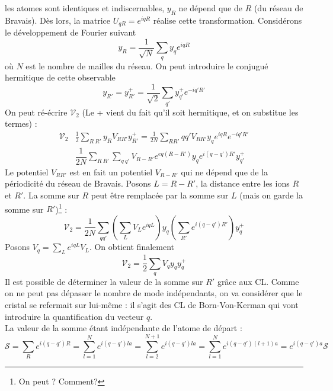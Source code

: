 les atomes sont identiques et indiscernables, $y_R$ ne dépend que de $R$ (du 
réseau de Bravais). Dès lors, la matrice $U_{qR} = e^{iqR}$ réalise cette 
transformation. Considérons le développement de Fourier suivant
\begin{equation}
y_R = \dfrac{1}{\sqrt{N}}\sum_q y_qe^{iqR}
\label{eq:DevFourier}
\end{equation}
où $N$ est le nombre de mailles du réseau. On peut introduire le conjugué hermitique 
de cette observable
\begin{equation}
y_{R'} = y_{R'}^+ = \dfrac{1}{\sqrt{2}}\sum_{q'} y_{q'}^+ e^{-iq'R'}
\end{equation}
On peut ré-écrire $\mathcal{V}_2$ (Le + vient du fait qu'il soit hermitique, et 
on substitue les termes) : 
\begin{equation}
\begin{array}{ll}
\mathcal{V}_2 & \displaystyle \frac{1}{2}\sum_{R\ R'} y_R V_{RR'}y_{R'}^+ = 
\frac{1}{2N}\sum_{RR'}{qq'} V_{RR'} y_qe^{iqR}e^{-iq'R'}\\
 & \displaystyle \dfrac{1}{2N}\sum_{R\ R'}\sum_{q\ q'} V_{R-R'}e^{eq(R-R')}y_q
 e^{i(q-q')R'}y_{q'}^+
\end{array}
\end{equation}
Le potentiel $V_{RR'}$ est en fait un potentiel $V_{R-R'}$ qui ne dépend que de la 
périodicité du réseau de Bravais. Posons $L = R-R'$, la distance entre les ions 
$R$ et $R'$. La somme sur $R$ peut être remplacée par la somme sur $L$ (mais on 
garde la somme sur $R'$)\footnote{On peut ? Comment?} :
\begin{equation}
\mathcal{V}_2 = \dfrac{1}{2N}\sum_{qq'}\left(\sum_L V_L e^{iqL}\right)y_q\left(
\sum_{R'} e^{i(q-q')R'}\right)y_q^+
\end{equation}
Posons $\displaystyle V_q = \sum_L e^{iqL}V_L$. On obtient finalement
\begin{equation}
\mathcal{V}_2 = \frac{1}{2}\sum_q V_qy_qy_q^+
\end{equation}
Il est possible de déterminer 
la valeur de la somme sur $R'$ grâce aux CL. Comme on ne peut pas dépasser le 
nombre de mode indépendants, on va considérer que le cristal se refermait sur 
lui-même : il s'agit des CL de Born-Von-Kerman qui vont introduire la 
quantification du vecteur $q$.\\
La valeur de la somme étant indépendante de l'atome de départ :
\begin{equation}
\mathcal{S} = \sum_R e^{i(q-q')R} = \sum_{l=1}^N e^{i(q-q')la} = \sum_{l=2}^{N+1} 
e^{i(q-q')la} = \sum_{l=1}^N e^{i(q-q')(l+1)a} = e^{i(q-q')a}\mathcal{S}
\end{equation}
